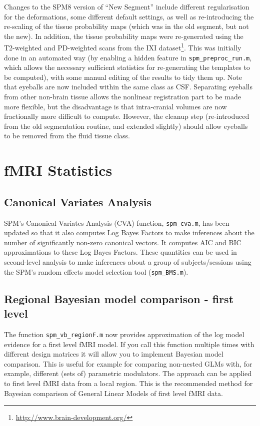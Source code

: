 \documentclass[a4paper,titlepage,openany]{article}
\begin{document}
\begin{multicols}{2}
Changes to the SPM8 version of ``New Segment'' include different regularisation for the deformations, some different default settings, as well as re-introducing the re-scaling of the tissue probability maps (which was in the old segment, but not the new).  In addition, the tissue probability maps were re-generated using the T2-weighted and PD-weighted scans from the IXI dataset\footnote{\url{http://www.brain-development.org/}}.
This was initially done in an automated way (by enabling a hidden feature in \texttt{spm\_preproc\_run.m}, which allows the necessary sufficient statistics for re-generating the templates to be computed), with some manual editing of the results to tidy them up.
Note that eyeballs are now included within the same class as CSF.
Separating eyeballs from other non-brain tissue allows the nonlinear registration part to be made more flexible, but the disadvantage is that intra-cranial volumes are now fractionally more difficult to compute.
However, the cleanup step (re-introduced from the old segmentation routine, and extended slightly) should allow eyeballs to be removed from the fluid tissue class.

\section{fMRI Statistics}

\subsection{Canonical Variates Analysis}

SPM's Canonical Variates Analysis (CVA) function, \texttt{spm\_cva.m}, has been updated so that it also computes Log Bayes Factors to make inferences about the number of significantly non-zero canonical vectors. It computes AIC and BIC approximations to these Log Bayes Factors. These quantities can be used in second-level analysis to make inferences about a group of subjects/sessions using the SPM's random effects model selection tool (\texttt{spm\_BMS.m}). 

\subsection{Regional Bayesian model comparison - first level}

The function \texttt{spm\_vb\_regionF.m} now provides approximation of the log model evidence for a first level fMRI model. If you call this function multiple times with different design matrices it will allow you to implement Bayesian model comparison. This is useful for example for comparing non-nested GLMs with, for example, different (sets of) parametric modulators. The approach can be applied to first level fMRI data from a local region. This is the recommended method for Bayesian comparison of General Linear Models of first level fMRI data.


\end{multicols}
\end{document}
